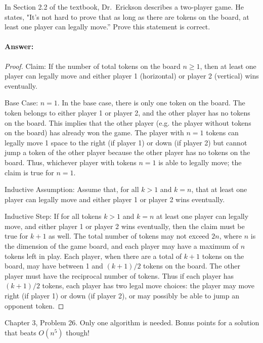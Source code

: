 \documentclass{article}
\begin{document}
In Section 2.2 of the textbook, Dr.~Erickson describes a two-player game.
He states, "It's not hard to prove that
as long as there are tokens on the board, at least one player can legally
move.''  Prove this statement is correct.

\paragraph{Answer:}
\begin{proof}
Claim: If the number of total tokens on the board $n \geq 1$, then at least one player can legally move and either player 1 (horizontal) or player 2 (vertical) wins eventually.

Base Case: $n = 1$. In the base case, there is only one token on the board. The token belongs to either player 1 or player 2, and the other player has no tokens on the board. This implies that the other player (e.g. the player without tokens on the board) has already won the game. The player with $n = 1$ tokens can legally move 1 space to the right (if player 1) or down (if player 2) but cannot jump a token of the other player because the other player has no tokens on the board. Thus, whichever player with tokens $n =1$ is able to legally move; the claim is true for $n = 1$.

Inductive Assumption: Assume that, for all $k > 1$ and $k = n$, that at least one player can legally move and either player 1 or player 2 wins eventually. 

Inductive Step: If for all tokens $k > 1$ and $k = n$ at least one player can legally move, and either player 1 or player 2 wins eventually, then the claim must be true for $k + 1$ as well. The total number of tokens may not exceed $2n$, where $n$ is the dimension of the game board, and each player may have a maximum of $n$ tokens left in play. Each player, when there are a total of $k + 1$ tokens on the board, may have between 1 and $(k + 1)/2$ tokens on the board. The other player must have the reciprocal number of tokens. Thus if each player has $(k+1)/2$ tokens, each player has two legal move choices: the player may move right (if player 1) or down (if player 2), or may possibly be able to jump an opponent token. 
\end{proof}

\collab{\todo{}}

Chapter 3, Problem 26.  Only one algorithm is needed. Bonus points for a
solution that beats $O(n^5)$ though!
\end{document}
